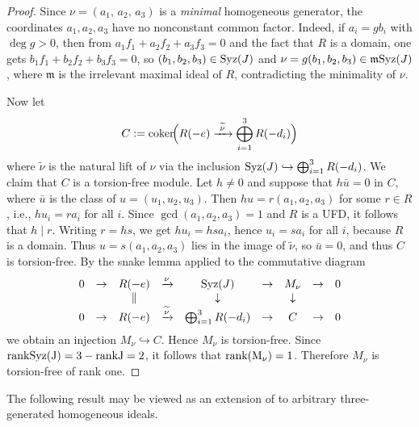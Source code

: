 \documentclass[11pt]{amsart} %
\theoremstyle{definition}
\def\rk{\rm rank}
\def\syz{\mbox{\rm Syz}}
\def\cok{\mbox{\rm coker}}
\def\fm{{\mathfrak m}}
\def\fm{{\mathfrak m}}
\def\rk{\rm rank}
\begin{document}
\begin{proof}
Since $\nu=(a_1,\, a_2,\, a_3)$ is a \emph{minimal} homogeneous generator, the coordinates $a_1,a_2,a_3$ have no nonconstant common factor. Indeed, if $a_i=g b_i$ with $\deg g>0$, then from
$a_1f_1+a_2f_2+a_3f_3=0$ and the fact that $R$ is a domain, one gets
$b_1f_1+b_2f_2+b_3f_3=0$, so $(b_1,b_2,b_3)\in \syz(J)$ and
$\nu=g(b_1,b_2,b_3)\in \fm\syz(J)$, where $\fm$ is the irrelevant maximal ideal of $R$, contradicting the minimality of $\nu$.

Now let
\[
C:=\cok\!\Big(R(-e)\xrightarrow{\ \widetilde{\nu}\ }
\bigoplus_{i=1}^3R(-d_i)\Big)
\]
where $\widetilde{\nu}$ is the natural lift of $\nu$ via the inclusion $\syz(J) \hookrightarrow \bigoplus_{i=1}^3 R(-d_i)$. We claim that $C$ is a torsion-free module. Let $h\neq 0$ and suppose that
$h\bar u=0$ in $C$, where $\bar u$ is the class of $u=(u_1,u_2,u_3)$.
Then $hu=r(a_1,a_2,a_3)$ for some $r\in R$, i.e.,
$hu_i=ra_i$ for all $i$. Since $\gcd(a_1,a_2,a_3)=1$ and $R$ is a UFD,
it follows that $h\mid r$. Writing $r=hs$, we get
$hu_i=hsa_i$, hence $u_i=sa_i$ for all $i$, because $R$ is a domain.
Thus $u=s(a_1,a_2,a_3)$ lies in the image of $\widetilde{\nu}$, so
$\bar u=0$, and thus $C$ is torsion-free. By the snake lemma applied to the commutative diagram
\[
\begin{array}{ccccccccc}
0&\to&R(-e)&\xrightarrow{\nu}&\syz(J)&\to&M_\nu&\to&0\\
&&\Vert&&\downarrow&&\downarrow\\
0&\to&R(-e)&\xrightarrow{\widetilde{\nu}}&
\bigoplus_{i=1}^3R(-d_i)&\to&C&\to&0
\end{array}
\]
we obtain an injection $M_\nu\hookrightarrow C$. Hence $M_\nu$ is torsion-free. Since $\rk \syz(J)=3-\rk J=2$, it follows that $\rk(M_\nu)=1$. Therefore $M_\nu$ is torsion-free of rank one. 
\end{proof}

The following result may be viewed as an extension of \cite[Theorem 2.1]{MAA} to arbitrary three-generated homogeneous ideals.
\end{document}
